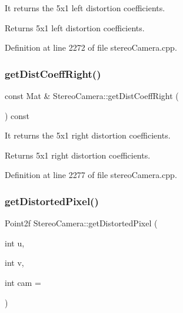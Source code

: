 It returns the 5x1 left distortion coefficients. 

\begin{DoxyReturn}{Returns}
5x1 left distortion coefficients. 
\end{DoxyReturn}


Definition at line 2272 of file stereo\+Camera.\+cpp.


\begin{DoxyCode}{0}

\end{DoxyCode}
\mbox{\label{classStereoCamera_a589ca8eb4ebfc4377589a77bb15b85b7}} 
\subsubsection{\texorpdfstring{getDistCoeffRight()}{getDistCoeffRight()}}
{\footnotesize\ttfamily const Mat \& Stereo\+Camera\+::get\+Dist\+Coeff\+Right (\begin{DoxyParamCaption}{ }\end{DoxyParamCaption}) const}



It returns the 5x1 right distortion coefficients. 

\begin{DoxyReturn}{Returns}
5x1 right distortion coefficients. 
\end{DoxyReturn}


Definition at line 2277 of file stereo\+Camera.\+cpp.


\begin{DoxyCode}{0}

\end{DoxyCode}
\mbox{\label{classStereoCamera_af64550bb8a7a665930dee5eea87b7e47}} 
\subsubsection{\texorpdfstring{getDistortedPixel()}{getDistortedPixel()}}
{\footnotesize\ttfamily Point2f Stereo\+Camera\+::get\+Distorted\+Pixel (\begin{DoxyParamCaption}\item[{int}]{u,  }\item[{int}]{v,  }\item[{int}]{cam = {} }\end{DoxyParamCaption})}



